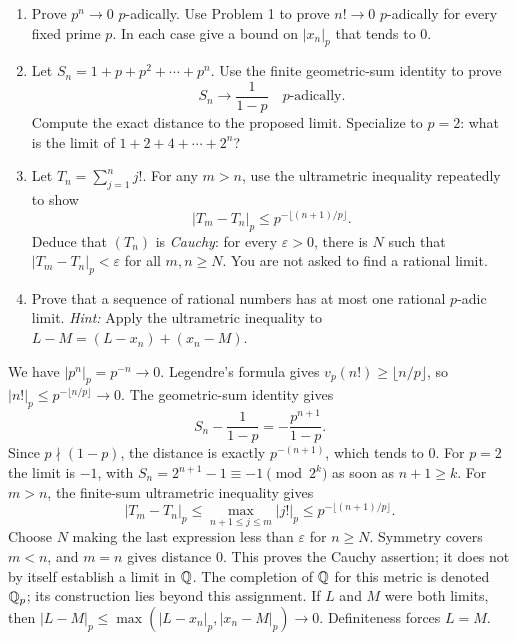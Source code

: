 \begin{enumerate}
 \item Prove $p^n\to0$ $p$-adically. Use Problem 1 to prove $n!\to0$
 $p$-adically for every fixed prime $p$. In each case give a bound on
 $|x_n|_p$ that tends to $0$. 
 \item Let $S_n=1+p+p^2+\cdots+p^n$. Use the finite geometric-sum identity
 to prove
 \[
 S_n\longrightarrow\frac{1}{1-p}\quad\text{$p$-adically}.
 \]
 Compute the exact distance to the proposed limit. Specialize to $p=2$:
 what is the limit of $1+2+4+\cdots+2^n$? 
 \item Let $T_n=\sum_{j=1}^n j!$. For any $m>n$, use the ultrametric
 inequality repeatedly to show
 \[
 |T_m-T_n|_p\le p^{-\lfloor(n+1)/p\rfloor}.
 \]
 Deduce that $(T_n)$ is \emph{Cauchy}: for every $\varepsilon>0$, there
 is $N$ such that $|T_m-T_n|_p<\varepsilon$ for all $m,n\ge N$.
 You are not asked to find a rational limit. 
 \item Prove that a sequence of rational numbers has at most one rational
 $p$-adic limit. \emph{Hint:} Apply the ultrametric inequality to
 $L-M=(L-x_n)+(x_n-M)$. 
\end{enumerate}
\begin{solution}
We have $|p^n|_p=p^{-n}\to0$. Legendre's formula gives
$v_p(n!)\ge\lfloor n/p\rfloor$, so $|n!|_p\le p^{-\lfloor n/p\rfloor}\to0$.
The geometric-sum identity gives
\[
 S_n-\frac{1}{1-p}=-\frac{p^{n+1}}{1-p}.
\]
Since $p\nmid(1-p)$, the distance is exactly $p^{-(n+1)}$, which tends
to $0$. For $p=2$ the limit is $-1$, with
$S_n=2^{n+1}-1\equiv-1\pmod{2^k}$ as soon as $n+1\ge k$.
For $m>n$, the finite-sum ultrametric inequality gives
\[
 |T_m-T_n|_p\le\max_{n+1\le j\le m}|j!|_p
 \le p^{-\lfloor(n+1)/p\rfloor}.
\]
Choose $N$ making the last expression less than $\varepsilon$ for
$n\ge N$. Symmetry covers $m<n$, and $m=n$ gives distance $0$.
This proves the Cauchy assertion; it does not by itself establish a limit
in $\mathbb Q$. The completion of $\mathbb Q$ for this metric is denoted $\mathbb Q_p$;
its construction lies beyond this assignment.
If $L$ and $M$ were both limits, then
$|L-M|_p\le\max(|L-x_n|_p,|x_n-M|_p)\to0$.
Definiteness forces $L=M$.
\end{solution}

